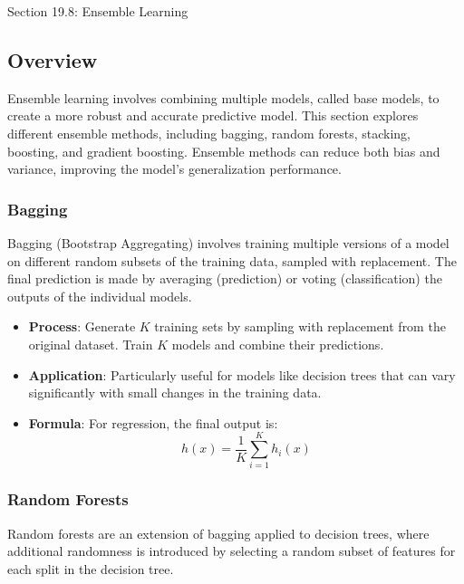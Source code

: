 \begin{notes}{Section 19.8: Ensemble Learning}
    \subsection*{Overview}

    Ensemble learning involves combining multiple models, called base models, to create a more robust and accurate predictive model. This section explores different ensemble methods, including bagging, 
    random forests, stacking, boosting, and gradient boosting. Ensemble methods can reduce both bias and variance, improving the model's generalization performance.
    
    \subsubsection*{Bagging}
    
    Bagging (Bootstrap Aggregating) involves training multiple versions of a model on different random subsets of the training data, sampled with replacement. The final prediction is made by averaging 
    (prediction) or voting (classification) the outputs of the individual models.
    
    \begin{highlight}[Bagging]
    
        \begin{itemize}
            \item \textbf{Process}: Generate $K$ training sets by sampling with replacement from the original dataset. Train $K$ models and combine their predictions.
            \item \textbf{Application}: Particularly useful for models like decision trees that can vary significantly with small changes in the training data.
            \item \textbf{Formula}: For regression, the final output is:
            \[
            h(x) = \frac{1}{K} \sum_{i=1}^{K} h_i(x)
            \]
        \end{itemize}
    
    \end{highlight}
    
    \subsubsection*{Random Forests}
    
    Random forests are an extension of bagging applied to decision trees, where additional randomness is introduced by selecting a random subset of features for each split in the decision tree.
    

\end{notes}
